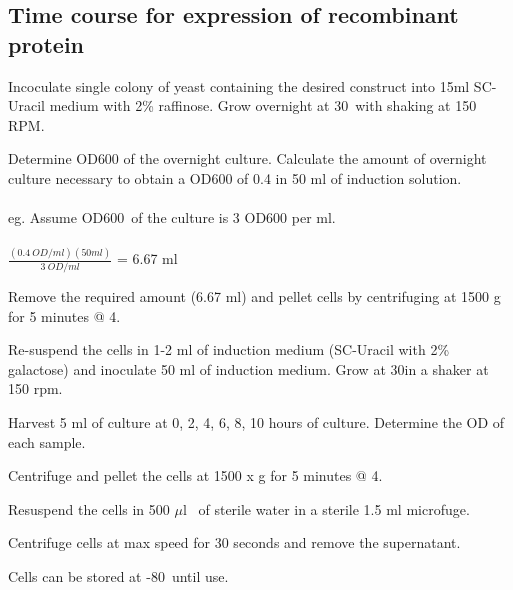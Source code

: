 \documentclass[a4paper,12pt]{article}
\newenvironment{packed_enum}{
\begin{enumerate}
  \setlength{\itemsep}{1pt}
  \setlength{\parskip}{0pt}
  \setlength{\parsep}{0pt}
}{\end{enumerate}}
\begin{document}
	\subsection{Time course for expression of recombinant  protein}
	\begin{packed_enum}
			\item Incoculate single colony of yeast containing the desired construct into 15ml SC-Uracil medium with 2\% raffinose. Grow overnight at 30\textcelsius \ with shaking at 150 RPM. 
			\item Determine OD{\scriptsize 600} of the overnight culture. Calculate the amount of overnight culture necessary to obtain a OD{\scriptsize 600} of 0.4 in 50 ml of induction solution.\\\\
			eg. Assume OD{\scriptsize 600}\ of the culture is 3 OD{\scriptsize600} per ml.\\ \\
			$\frac {(0.4 \ OD/ml)(50ml)}{3 \ OD/ml}$ = 6.67 ml\\
			\item Remove the required amount (6.67 ml) and pellet cells by centrifuging at 1500 g for 5 minutes @ 4\textcelsius.
			\item Re-suspend the cells in 1-2 ml of induction medium (SC-Uracil with 2\% galactose) and inoculate 50 ml of induction medium. Grow at 30\textcelsius in a shaker at 150 rpm.
			\item Harvest 5 ml of culture at 0, 2, 4, 6, 8, 10 hours of culture. Determine the OD of each sample.
			\item Centrifuge and pellet the cells at 1500 x g for 5 minutes @ 4\textcelsius.
			\item Resuspend the cells in 500 $\mu$l \ of sterile water in a sterile 1.5 ml microfuge.
			\item Centrifuge cells at max speed for 30 seconds and remove the supernatant.
			\item Cells can be stored at -80\textcelsius \ until use.			
	\end{packed_enum}
\end{document}
